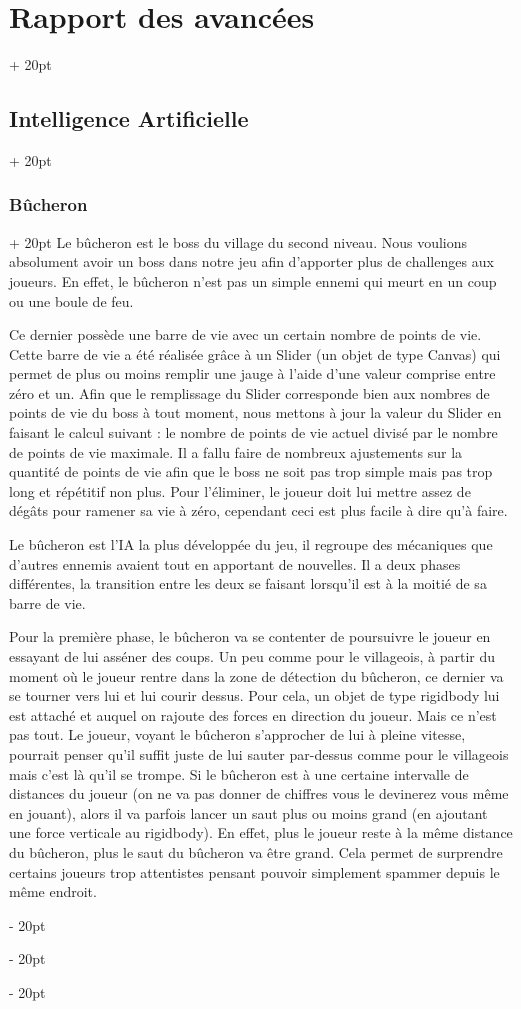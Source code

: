 \documentclass[a4paper, 12pt, twoside]{article}
\newcommand{\ind}[1][20pt]{\advance\leftskip + #1}
\newcommand{\deind}[1][20pt]{\advance\leftskip - #1}
\newenvironment{indt}[2][20pt]{#2 \par \ind[#1]}{\par \deind} %
\begin{document}
\begin{indt}{\section{Rapport des avancées}}
\begin{indt}{\subsection{Intelligence Artificielle}}
\begin{indt}{\subsubsection{Bûcheron}}
                Le bûcheron est le boss du village du second niveau. Nous voulions absolument avoir un boss dans notre jeu afin d’apporter plus de challenges aux joueurs. En effet, le bûcheron n’est pas un simple ennemi qui meurt en un coup ou une boule de feu.

                Ce dernier possède une barre de vie avec un certain nombre de points de vie. Cette barre de vie a été réalisée grâce à un Slider (un objet de type Canvas) qui permet de plus ou moins remplir une jauge à l’aide d’une valeur comprise entre zéro et un. Afin que le remplissage du Slider corresponde bien aux nombres de points de vie du boss à tout moment, nous mettons à jour la valeur du Slider en faisant le calcul suivant : le nombre de points de vie actuel divisé par le nombre de points de vie maximale. Il a fallu faire de nombreux ajustements sur la quantité de points de vie afin que le boss ne soit pas trop simple mais pas trop long et répétitif non plus.  Pour l'éliminer, le joueur doit lui mettre assez de dégâts pour ramener sa vie à zéro, cependant ceci est plus facile à dire qu'à faire.

                Le bûcheron est l’IA la plus développée du jeu, il regroupe des mécaniques que d’autres ennemis avaient tout en apportant de nouvelles. Il a deux phases différentes, la transition entre les deux se faisant lorsqu’il est à la moitié de sa barre de vie.

                Pour la première phase, le bûcheron va se contenter de poursuivre le joueur en essayant de lui asséner des coups. Un peu comme pour le villageois, à partir du moment où le joueur rentre dans la zone de détection du bûcheron, ce dernier va se tourner vers lui et lui courir dessus. Pour cela, un objet de type rigidbody lui est attaché et auquel on rajoute des forces en direction du joueur. Mais ce n’est pas tout. Le joueur, voyant le bûcheron s’approcher de lui à pleine vitesse, pourrait penser qu’il suffit juste de lui sauter par-dessus comme pour le villageois mais c’est là qu’il se trompe. Si le bûcheron est à une certaine intervalle de distances du joueur (on ne va pas donner de chiffres vous le devinerez vous même en jouant), alors il va parfois lancer un saut plus ou moins grand (en ajoutant une force verticale au rigidbody). En effet, plus le joueur reste à la même distance du bûcheron, plus le saut du bûcheron va être grand. Cela permet de surprendre certains joueurs trop attentistes pensant pouvoir simplement spammer depuis le même endroit.


\end{indt}
\end{indt}
\end{indt}
\end{document}
